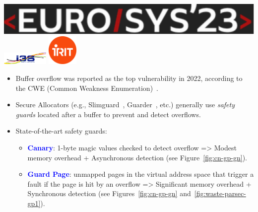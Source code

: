 \documentclass[landscape,a0paper,fontscale=0.3]{baposter} %
\begin{document}
\begin{poster}
{    \includegraphics[height=.9em]{figures/eurosys_23} %
    \hspace*{.3mm}
    \includegraphics[height=1.7em]{figures/I3S}
} 
{
    \includegraphics[height=4em]{figures/irit2}
}

{
    \begin{itemize}
        \item Buffer overflow was reported as the top vulnerability in 2022, according to the CWE (Common Weakness Enumeration)~\cite{top25}.
        \item Secure Allocators (e.g., Slimguard~\cite{slimguard}, Guarder~\cite{guarder}, etc.) generally use \emph{safety guards} located after a buffer to prevent and detect overflows.
        \item State-of-the-art safety guards: 
            \begin{itemize}
                \item \textcolor{blue}{\bf Canary}: 1-byte magic values checked to detect overflow => Modest memory overhead + Asynchronous detection (see Figure~\ref{fig:cn-gp-gn}).
                \item \textcolor{blue}{\textbf{Guard Page}}: unmapped pages in the virtual address space that trigger a fault if the page is hit by an overflow => Significant memory overhead + Synchronous detection (see Figures~\ref{fig:cn-gp-gn} and~\ref{fig:waste-parsec-gp1}).
            \end{itemize}
    \end{itemize}

}
\end{poster}
\end{document}
